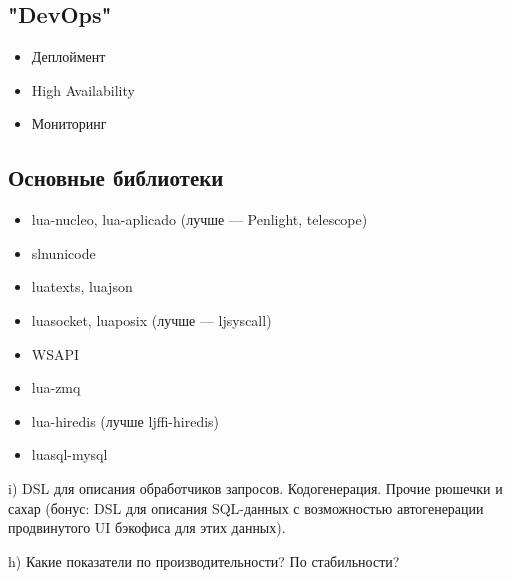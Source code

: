 \documentclass[aspectratio=169,handout,bigger]{beamer}
\begin{document}
\subsection*{"DevOps"}

\begin{frame}
  \begin{itemize}
    \item Деплоймент
    \item High Availability
    \item Мониторинг
  \end{itemize}
\end{frame}


\subsection*{Основные библиотеки}

\begin{frame}
  \begin{itemize}
    \item lua-nucleo, lua-aplicado (лучше — Penlight, telescope)
    \item slnunicode
    \item luatexts, luajson
    \item luasocket, luaposix (лучше — ljsyscall)
    \item WSAPI
    \item lua-zmq
    \item lua-hiredis (лучше ljffi-hiredis)
    \item luasql-mysql
  \end{itemize}
\end{frame}


\begin{frame}

i) DSL для описания обработчиков запросов. Кодогенерация. Прочие рюшечки и сахар (бонус: DSL для описания SQL-данных с возможностью автогенерации продвинутого UI бэкофиса для этих данных).
\end{frame}



\begin{frame}
h) Какие показатели по производительности? По стабильности?
\end{frame}
\end{document}

